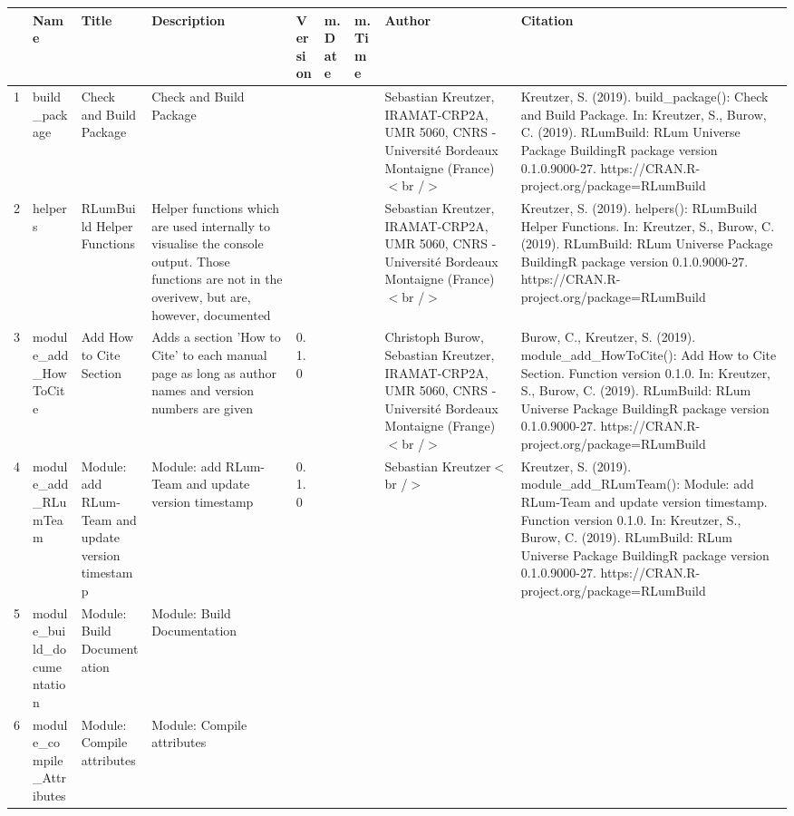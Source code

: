 \begin{table}[ht]
\centering
\begin{tabular}{rllllllll}
  \hline
 & Name & Title & Description & Version & m.Date & m.Time & Author & Citation \\ 
  \hline
1 & build\_package & Check and Build Package & Check and Build Package &  &  &  & Sebastian Kreutzer, IRAMAT-CRP2A, UMR 5060, CNRS - Université Bordeaux Montaigne (France)$<$br /$>$ & Kreutzer, S. (2019). build\_package(): Check and Build Package. In: Kreutzer, S., Burow, C. (2019). RLumBuild: RLum Universe Package BuildingR package version 0.1.0.9000-27. https://CRAN.R-project.org/package=RLumBuild
 \\ 
  2 & helpers & RLumBuild Helper Functions & Helper functions which are used internally to visualise the console output. Those functions are not in the overivew, but are, however, documented &  &  &  & Sebastian Kreutzer, IRAMAT-CRP2A, UMR 5060, CNRS - Université Bordeaux Montaigne (France)$<$br /$>$ & Kreutzer, S. (2019). helpers(): RLumBuild Helper Functions. In: Kreutzer, S., Burow, C. (2019). RLumBuild: RLum Universe Package BuildingR package version 0.1.0.9000-27. https://CRAN.R-project.org/package=RLumBuild
 \\ 
  3 & module\_add\_HowToCite & Add How to Cite Section & Adds a section 'How to Cite' to each manual page as long as author names and version numbers are given & 0.1.0
 &  &  & Christoph Burow, Sebastian Kreutzer, IRAMAT-CRP2A, UMR 5060, CNRS - Université Bordeaux Montaigne (Frange)$<$br /$>$ & Burow, C., Kreutzer, S. (2019). module\_add\_HowToCite(): Add How to Cite Section. Function version 0.1.0. In: Kreutzer, S., Burow, C. (2019). RLumBuild: RLum Universe Package BuildingR package version 0.1.0.9000-27. https://CRAN.R-project.org/package=RLumBuild
 \\ 
  4 & module\_add\_RLumTeam & Module: add RLum-Team and update version timestamp & Module: add RLum-Team and update version timestamp & 0.1.0
 &  &  & Sebastian Kreutzer$<$br /$>$ & Kreutzer, S. (2019). module\_add\_RLumTeam(): Module: add RLum-Team and update version timestamp. Function version 0.1.0. In: Kreutzer, S., Burow, C. (2019). RLumBuild: RLum Universe Package BuildingR package version 0.1.0.9000-27. https://CRAN.R-project.org/package=RLumBuild
 \\ 
  5 & module\_build\_documentation & Module: Build Documentation & Module: Build Documentation &  &  &  &  &  \\ 
  6 & module\_compile\_Attributes & Module: Compile attributes & Module: Compile attributes &  &  &  &  &  \\ 

\end{tabular}
\end{table}

